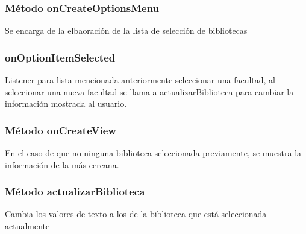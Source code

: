 \subsubsection{Método onCreateOptionsMenu}
Se encarga de la elbaoración de la lista de selección de bibliotecas

\subsubsection{onOptionItemSelected}
Listener para lista mencionada anteriormente seleccionar una facultad, al seleccionar una nueva facultad se llama a actualizarBiblioteca para cambiar la información mostrada al usuario.

\subsubsection{Método onCreateView}
En el caso de que no ninguna biblioteca seleccionada previamente, se muestra la información de la más cercana.

\subsubsection{Método actualizarBiblioteca}
Cambia los valores de texto a los de la biblioteca que está seleccionada actualmente
